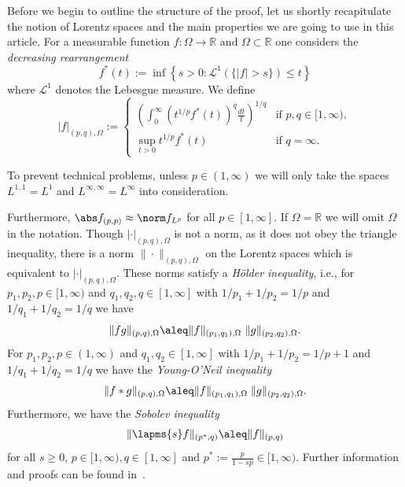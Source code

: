 Before we begin to outline the structure of the proof, let us shortly recapitulate the notion of 
Lorentz spaces and the main properties we are going to use in this article. For a measurable 
function $f: \Omega \rightarrow \mathbb R$ and $\Omega \subset \mathbb R$
one considers the \emph{decreasing rearrangement}
\begin{equation*}
 f^\ast (t):= \inf\left\{s>0: {\mathcal L}^1(\{|f|> s\})\leq t\right\}
\end{equation*}
where $\mathcal L^1$ denotes the Lebesgue measure. We define
\begin{equation*}
 |f|_{(p,q),\Omega} := \begin{cases}
                      \left(\int_0^\infty (t^{1/p} f^\ast (t)) ^q \frac {dt}{t}\right)^{1/q}  
			&\text{if } p,q \in[1, \infty),\\
                      \sup_{t>0} t^{1/p} f^\ast (t)&\text{if } q=\infty.
                     \end{cases}
\end{equation*}

To prevent technical problems, unless $p \in (1,\infty)$
we will only take the spaces  $L^{1,1} = L^1$ and $L^{\infty,\infty} =  L^\infty$
into consideration.

Furthermore, $\abs f_{(p,p)}\approx\norm f_{L^p}$ for all $p\in[1,\infty]$.
If $\Omega = \mathbb R$ we will omit $\Omega$ in the notation.
Though $|\cdot|_{(p,q), \Omega}$ is not a norm, as it does not obey the triangle inequality, there
is a norm $\|\cdot\|_{(p,q), \Omega}$ on the Lorentz spaces which is equivalent to $|\cdot|_{(p,q),\Omega}$.
These norms satisfy a \emph{H\"older inequality}, i.e., for $p_1,p_2,p \in [1, \infty)$
and $q_1,q_2,q \in [1,\infty]$ with $1/p_1 + 1/p_2 = 1/p$ and $1/q_1 + 1/q_2 = 1/q$ we
have 
\begin{equation}\label{eq:hoelder}
  \|fg\|_{(p,q), \Omega} \aleq \|f\|_{(p_1,q_1), \Omega}\ \|g\|_{(p_2,q_2), \Omega}.
\end{equation}
For $p_1, p_2, p \in (1,\infty)$ and $q_1,q_2 \in [1, \infty]$
with $1/p_1 + 1/p_2 = 1 /p + 1$ and $1/q_1 +1/q_2 = 1/q$ we have the \emph{Young-O'Neil inequality} \cite{Hunt66}
\begin{equation}\label{eq:young}
 \|f \ast g\|_{(p,q), \Omega} \aleq \|f\|_{(p_1,q_1),\Omega}\; \|g\|_{(p_2,q_2), \Omega}.
\end{equation}
Furthermore, we have the \emph{Sobolev inequality} 
\begin{equation*}
 \|\lapms{s} f\|_{(p^\ast,q)} \aleq \|f\|_{(p,q)}
\end{equation*}
for all $s\ge0$, $p\in [1,\infty), q \in [1, \infty]$ and $p^\ast :=  \frac {p}{1-sp} \in [1,\infty)$.
Further information and proofs can be found in~\cite{Hunt66,GrafakosC,Tartar2007}.

